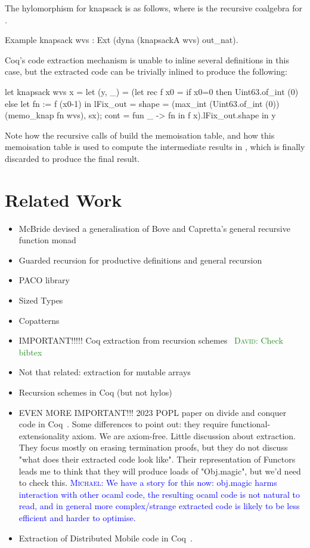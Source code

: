 \documentclass[anonymous, a4paper, UKenglish, cleveref, autoref, thm-restate]{lipics-v2021}
\newcommand{\dcas}[1]{\textcolor{ForestGreen}{\textsc{David}: #1}}
\newcommand{\mvol}[1]{\textcolor{blue}{\textsc{Michael}: #1}}
\begin{document}
The hylomorphism for knapsack is as follows, where  is the
recursive coalgebra for .
\begin{coqcode}
Example knapsack wvs : Ext (dyna (knapsackA wvs) out_nat).
\end{coqcode}
Coq's code extraction mechanism is unable to inline several definitions in
this case, but the extracted code can be trivially inlined to produce the
following:
\begin{ocamlcode}
let knapsack wvs x =
  let (y, _) =
    (let rec f x0 =
      if x0=0 then Uint63.of_int (0)
      else let fn := f (x0-1) in { lFix_out = { 
           shape = (max_int (Uint63.of_int (0)) (memo_knap fn wvs), sx);
           cont = fun _ -> fn } }
     in f x).lFix_out.shape
  in y
\end{ocamlcode}
Note how the recursive calls of  build the memoisation table, and how
this memoisation table is used to compute the intermediate results in
, which is finally discarded to produce the final result.

\section{Related Work}

\begin{itemize}
  \item McBride devised a generalisation of Bove and Capretta's general
recursive function monad~\cite{McBride15, BoveC01}
  \item Guarded recursion for productive definitions and general recursion
~\cite{AtkeyM13, PaviottiMB15}
  \item PACO library~\cite{HurNDV13}
  \item Sized Types \cite{HughesPS96, abs-1202-3496}
  \item Copatterns \cite{AbelPTS13, AbelP16}
  \item IMPORTANT!!!!! Coq extraction from recursion
    schemes~\cite{larchey2022braga} \dcas{Check bibtex}
  \item Not that related: extraction for mutable arrays~\cite{SAKAGUCHI2020102372}
  \item Recursion schemes in Coq (but not hylos)~\cite{MurataE19}
  \item EVEN MORE IMPORTANT!!! 2023 POPL paper on divide and conquer code in
    Coq~\cite{AbreuDHJMS23}.  Some differences to point out: they require
    functional-extensionality axiom. We are axiom-free. Little discussion about
    extraction. They focus mostly on erasing termination proofs, but they do
    not discuss "what does their extracted code look like". Their
    representation of Functors leads me to think that they will produce loads
        of "Obj.magic", but we'd need to check this. \mvol{We have a story for this now: obj.magic harms interaction with other ocaml code, the resulting ocaml code is not natural to read, and in general more complex/strange extracted code is likely to be less efficient and harder to optimise.}
        \item Extraction of Distributed Mobile code in Coq~\cite{MiculanP12}.
\end{itemize}
\end{document}
